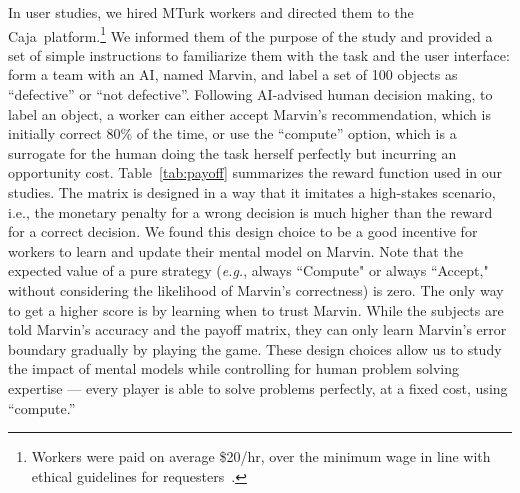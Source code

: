 \documentclass[letterpaper]{article} %
\newcommand{\bug}
    {\mbox{\rule{2mm}{2mm}}}
\newcommand{\Bug}[1]
    {\bug \footnote{BUG: {#1}}}
\newcommand{\eg}{\mbox{\it e.g.}}
\newcommand{\?}{\mbox{?}}
\newcommand{\name}{AI-advised human decision making}
\newcommand{\plat}{{\sc Caja}}
\begin{document}
 In user studies, we hired MTurk workers and directed them to the \plat\ platform.\footnote{Workers were paid on average \$20/hr, over the minimum wage in line with  ethical guidelines for requesters~\cite{dynamo-MT-ethics17}.} We informed them of the purpose of the study and provided a set of simple instructions to familiarize them with the task and the user interface: form a team with an AI, named Marvin, and label a set of 100 objects as ``defective'' or ``not defective''.  
Following \name, to label an object, a worker can either accept Marvin's recommendation, which is initially correct 80\% of the time, or use the ``compute'' option, which is a surrogate for the human doing the task herself perfectly but incurring an opportunity cost.
Table~\ref{tab:payoff} summarizes the reward function  used in our studies. The matrix is designed in a way that it imitates a high-stakes scenario, i.e., the monetary penalty for a wrong decision is much higher than the reward for a correct decision. We found this design choice to be a good incentive for workers to learn and update their mental model on Marvin.  %
Note that the expected value of a pure strategy (\eg, always ``Compute"  or always ``Accept," without considering the likelihood of Marvin's correctness) is zero. The only way to get a higher score is by learning when to trust Marvin. While the subjects are told  Marvin's accuracy and the payoff matrix, they can only learn Marvin's error boundary gradually by playing the game.   These design choices allow us to study the impact of mental models while controlling for human problem solving expertise --- every player is able to solve  problems perfectly, at a fixed cost,  using ``compute.''\\

\end{document}

